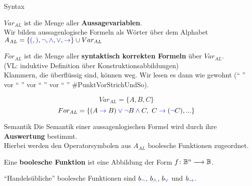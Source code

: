 \begin{frame}{Syntax}
	\begin{Definition}
		$Var_{AL}$ ist die Menge aller \textbf{Aussagevariablen}. \\
		Wir bilden aussagenlogische Formeln als Wörter über dem Alphabet $A_{AL} = \{ \textcolor{blue}{(}\text{}, \textcolor{blue}{)}\text{}, \textcolor{blue}{\neg}, \mathbin{\textcolor{blue}{\wedge}}, \mathbin{\textcolor{blue}{\vee}}, \mathrel{\textcolor{blue}{\to}} \} \cup Var_{AL}$ 
	\end{Definition}
	\pause
	\begin{Definition}
		$For_{AL}$ ist die Menge aller \textbf{syntaktisch korrekten Formeln} über $Var_{AL}$.\\
		\medskip
		(VL: induktive Definition über Konstruktionsabbildungen) \\
		Klammern, die überflüssig sind, können weg. Wir lesen es dann wie gewohnt (\enquote{ \bnot} vor \enquote{ \bund} vor \enquote{ \boder} vor \enquote{ \bimp}  {\small \#PunktVorStrichUndSo}).
	\end{Definition}
	\pause
	\begin{Beispiel}
		$$Var_{AL} = \{A, B, C\}$$
		$$For_{AL} = \left\{(A  \mathrel{\textcolor{blue}{\to}} B) \mathbin{\textcolor{blue}{\vee}} \textcolor{blue}{\neg} B \mathbin{\textcolor{blue}{\wedge}} C, \ C \mathrel{\textcolor{blue}{\to}} (\textcolor{blue}{\neg} C), ...\right\}$$
	\end{Beispiel}
\end{frame}

\begin{frame}{Semantik}
	Die Semantik einer aussagenlogischen Formel wird durch ihre \textbf{Auswertung} bestimmt.\\
	Hierbei werden den Operatorsymbolen aus $A_{AL}$ boolesche Funktionen zugeordnet.
	
	\pause
	\begin{Definition}
		Eine \textbf{boolesche Funktion} ist eine Abbildung der Form
		$f \colon \mathbb{B}^n \longrightarrow \mathbb{B}$.
	\end{Definition}

	\pause
	\begin{Beispiel}
		\enquote{Handelsübliche} boolesche Funktionen sind  $b_{\textcolor{blue}{\neg}}$,
		$b_{\mathbin{\textcolor{blue}{\wedge}}}$, $b_{\mathbin{\textcolor{blue}{\vee}}}$ und $b_{\mathrel{\textcolor{blue}{\to}}}$. 
	\end{Beispiel}
\end{frame}

